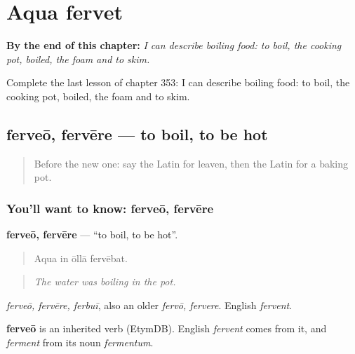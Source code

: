
\chapter{Aqua fervet}
\label{ch:la-aqua-fervet}

\begin{chapteropening}
\textbf{By the end of this chapter:} \emph{I can describe boiling food: to boil, the cooking pot, boiled, the foam and to skim.}

Complete the last lesson of chapter 353: I can describe boiling food: to boil, the cooking pot, boiled, the foam and to skim.
\end{chapteropening}

\section[ferveō, fervēre]{ferveō, fervēre — to boil, to be hot}

\label{lesson:LA-C353-ferveo}



\begin{quote}
Before the new one: say the Latin for leaven, then the Latin for a baking pot.
\end{quote}

\subsection*{You'll want to know: ferveō, fervēre}
\textbf{ferveō, fervēre} — \textquotedblleft{}to boil, to be hot\textquotedblright{}.

\begin{quote}
Aqua in ōllā fervēbat.
\end{quote}

\begin{quote}
\emph{The water was boiling in the pot.}
\end{quote}

\emph{ferveō, fervēre, ferbuī}, also an older \emph{fervō, fervere}. English \emph{fervent}.

\begin{cousinweb}
\textbf{ferveō} is an inherited verb (EtymDB). English \emph{fervent} comes from it, and \emph{ferment} from its noun \emph{fermentum}.
\end{cousinweb}

